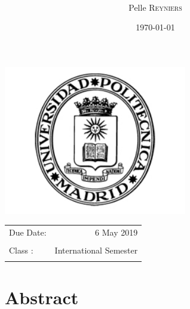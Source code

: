 \documentclass[twoside,a4paper]{article}
\title{\maintitle \\ \course \\{\small\ \coursenumber}} %
\author{Pelle \textsc{Reyniers} \\ } %
\date{\today} %
\newcommand{\class}{International Semester}
\begin{document}
    \sloppy %
    \begin{titlepage}
    \maketitle %
    
    \vfill
    \begin{center}
    \includegraphics[width=0.6\textwidth]{upm_logo.png} %
    \end{center}
    \vfill
    \vfill
    \vfill
    
    \begin{center}
    \begin{tabular}{l r}
    Due Date: & 6 May 2019 \\ %
    \\
    Class : & \class \\
    \\
    \end{tabular}
    \end{center}
    \vfill
    \vfill
    \end{titlepage}
    \clearpage
    
    
    
    \section*{Abstract}
    
    \newpage
\end{document}
